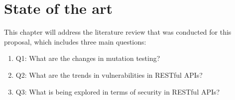 \chapter{State of the art}

This chapter will address the literature review that was conducted for this proposal, which includes three main questions:
\begin{enumerate}
    \item Q1: What are the changes in mutation testing?
    \item Q2: What are the trends in vulnerabilities in RESTful APIs?
    \item Q3: What is being explored in terms of security in RESTful APIs?
\end{enumerate}
